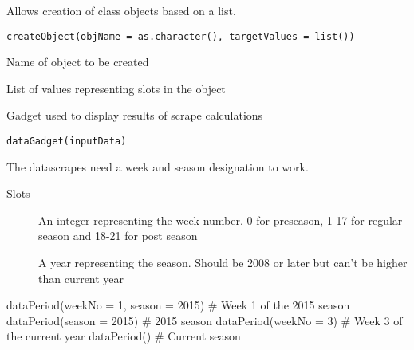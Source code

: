 \documentclass[a4paper]{book}
\begin{document}
%
\begin{Description}\relax
Allows creation of class objects based on a list.
\end{Description}
%
\begin{Usage}
\begin{verbatim}
createObject(objName = as.character(), targetValues = list())
\end{verbatim}
\end{Usage}
%
\begin{Arguments}
\begin{ldescription}
\item[\code{objName}] Name of object to be created

\item[\code{targetValues}] List of values representing slots in the object
\end{ldescription}
\end{Arguments}
%
\begin{Description}\relax
Gadget used to display results of scrape calculations
\end{Description}
%
\begin{Usage}
\begin{verbatim}
dataGadget(inputData)
\end{verbatim}
\end{Usage}
%
\begin{Description}\relax
The datascrapes need a week and season designation to work.
\end{Description}
%
\begin{Section}{Slots}

\begin{description}

\item[] An integer representing the week number. 0 for preseason, 1-17
for regular season and 18-21 for post season

\item[] A year representing the season. Should be 2008 or later but
can't be higher than current year

\end{description}
\end{Section}
%
\begin{Examples}
\begin{ExampleCode}
dataPeriod(weekNo = 1, season = 2015) # Week 1 of the 2015 season
dataPeriod(season = 2015)             # 2015 season
dataPeriod(weekNo = 3)                # Week 3 of the current year
dataPeriod()                          # Current season
\end{ExampleCode}
\end{Examples}
\end{document}
